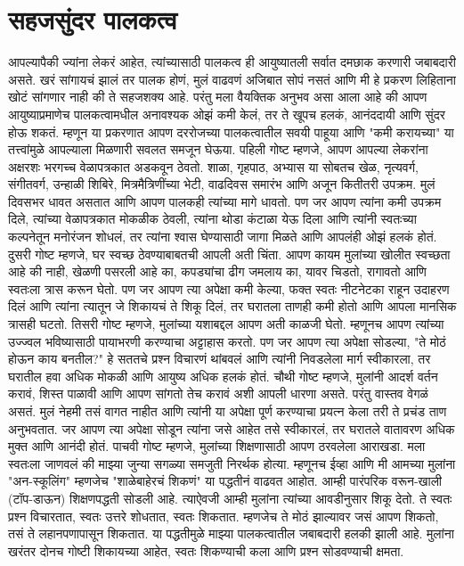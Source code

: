  \chapter{सहजसुंदर पालकत्व}
आपल्यापैकी ज्यांना लेकरं आहेत, त्यांच्यासाठी पालकत्व ही आयुष्यातली सर्वात दमछाक करणारी जबाबदारी असते. खरं सांगायचं झालं तर पालक होणं, मुलं वाढवणं अजिबात सोपं नसतं आणि मी हे प्रकरण लिहिताना खोटं सांगणार नाही की ते सहजशक्य आहे.
परंतु मला वैयक्तिक अनुभव असा आला आहे की आपण आयुष्याप्रमाणेच पालकत्वामधील अनावश्यक ओझं कमी केलं, तर ते खूपच हलकं, आनंददायी आणि सुंदर होऊ शकतं. म्हणून या प्रकरणात आपण दररोजच्या पालकत्वातील सवयी पाहूया आणि "कमी करायच्या" या तत्त्वांमुळे आपल्याला मिळणारी सवलत समजून घेऊया.
पहिली गोष्ट म्हणजे, आपण आपल्या लेकरांना अक्षरशः भरगच्च वेळापत्रकात अडकवून ठेवतो. शाळा, गृहपाठ, अभ्यास या सोबतच खेळ, नृत्यवर्ग, संगीतवर्ग, उन्हाळी शिबिरे, मित्रमैत्रिणींच्या भेटी, वाढदिवस समारंभ आणि अजून कितीतरी उपक्रम. मुलं दिवसभर धावत असतात आणि आपण पालकही त्यांच्या मागे धावतो. पण जर आपण त्यांना कमी उपक्रम दिले, त्यांच्या वेळापत्रकात मोकळीक ठेवली, त्यांना थोडा कंटाळा येऊ दिला आणि त्यांनी स्वतःच्या कल्पनेतून मनोरंजन शोधलं, तर त्यांना श्वास घेण्यासाठी जागा मिळते आणि आपलंही ओझं हलकं होतं.
दुसरी गोष्ट म्हणजे, घर स्वच्छ ठेवण्याबाबतची आपली अती चिंता. आपण कायम मुलांच्या खोलीत स्वच्छता आहे की नाही, खेळणी पसरली आहे का, कपड्यांचा ढीग जमलाय का, यावर चिडतो, रागावतो आणि स्वतःला त्रास करून घेतो. पण जर आपण त्या अपेक्षा कमी केल्या, फक्त स्वतः नीटनेटका राहून उदाहरण दिलं आणि त्यांना त्यातून जे शिकायचं ते शिकू दिलं, तर घरातला ताणही कमी होतो आणि आपला मानसिक त्रासही घटतो.
तिसरी गोष्ट म्हणजे, मुलांच्या यशाबद्दल आपण अती काळजी घेतो. म्हणूनच आपण त्यांच्या उज्ज्वल भविष्यासाठी पायाभरणी करण्याचा अट्टाहास करतो. पण जर आपण त्या अपेक्षा सोडल्या, "ते मोठं होऊन काय बनतील?" हे सततचे प्रश्न विचारणं थांबवलं आणि त्यांनी निवडलेला मार्ग स्वीकारला, तर घरातील हवा अधिक मोकळी आणि आयुष्य अधिक हलकं होतं.
चौथी गोष्ट म्हणजे, मुलांनी आदर्श वर्तन करावं, शिस्त पाळावी आणि आपण सांगतो तेच करावं अशी आपली धारणा असते. परंतु वास्तव वेगळं असतं. मुलं नेहमी तसं वागत नाहीत आणि त्यांनी या अपेक्षा पूर्ण करण्याचा प्रयत्न केला तरी ते प्रचंड ताण अनुभवतात. जर आपण त्या अपेक्षा सोडून त्यांना जसे आहेत तसे स्वीकारलं, तर घरातले वातावरण अधिक मुक्त आणि आनंदी होतं.
पाचवी गोष्ट म्हणजे, मुलांच्या शिक्षणासाठी आपण ठरवलेला आराखडा. मला स्वतःला जाणवलं की माझ्या जुन्या सगळ्या समजुती निरर्थक होत्या. म्हणूनच ईव्हा आणि मी आमच्या मुलांना "अन-स्कूलिंग" म्हणजेच "शाळेबाहेरचं शिकणं" या पद्धतीनं वाढवत आहोत. आम्ही पारंपरिक वरून-खाली (टॉप-डाऊन) शिक्षणपद्धती सोडली आहे. त्याऐवजी आम्ही मुलांना त्यांच्या आवडीनुसार शिकू देतो. ते स्वतः प्रश्न विचारतात, स्वतः उत्तरे शोधतात, स्वतः शिकतात. म्हणजेच ते मोठं झाल्यावर जसं आपण शिकतो, तसं ते लहानपणापासून शिकतात. या पद्धतीमुळे माझ्या पालकत्वातील जबाबदारी हलकी झाली आहे. मुलांना खरंतर दोनच गोष्टी शिकायच्या आहेत, स्वतः शिकण्याची कला आणि प्रश्न सोडवण्याची क्षमता.
